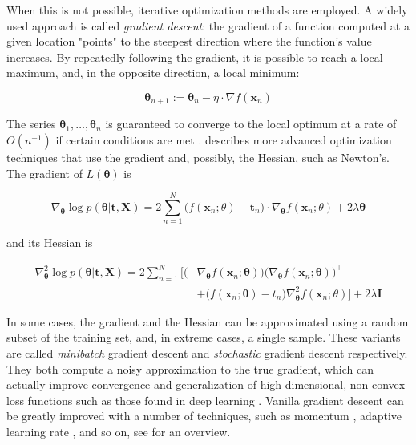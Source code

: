 \documentclass[a4paper,11pt]{kth-mag}
\begin{document}
When this is not possible, iterative optimization methods are employed. A widely used approach is called \emph{gradient descent}: the gradient of a function computed at a given location "points" to the steepest direction where the function's value increases. By repeatedly following the gradient, it is possible to reach a local maximum, and, in the opposite direction, a local minimum:

\begin{equation}
\bm\theta_{n+1}:=\bm\theta_n-\eta\cdot\nabla f(\bm x_n)
\end{equation}

The series $\bm\theta_1,\ldots,\bm\theta_n$ is guaranteed to converge to the local optimum at a rate of $O(n^{-1})$ if certain conditions are met \citep{gd_convergence}. \cite{numopt} describes more advanced optimization techniques that use the gradient and, possibly, the Hessian, such as Newton's. The gradient of $L(\bm\theta)$ is

\begin{equation}
\label{eq:least_squares_gradient}
\nabla_{\bm\theta}\log p(\bm\theta\vert\bm t,\bm X)
=2\sum_{n=1}^N \big(f(\bm x_n;\theta)-\bm t_n\big)\cdot\nabla_{\bm\theta}f(\bm x_n;\theta) + 2\lambda\bm\theta
\end{equation}

\noindent and its Hessian is

\begin{equation}
\label{eq:least_squares_hessian}
\begin{split}
\nabla^2_{\bm\theta}\log p(\bm\theta\vert\bm t,\bm X)=2\sum_{n=1}^{N}\bigg[
\big( & \nabla_{\bm\theta} f(\bm x_n;\bm\theta)\big)
\big(\nabla_{\bm\theta} f(\bm x_n;\bm\theta)\big)^\intercal
\\
& +\big(f(\bm x_n;\bm\theta)-t_n\big)\nabla^2_{\bm\theta}f(\bm x_n;\theta)\bigg]+2\lambda\bm I
\end{split}
\end{equation}

In some cases, the gradient and the Hessian can be approximated using a random subset of the training set, and, in extreme cases, a single sample. These variants are called \emph{minibatch} gradient descent and \emph{stochastic} gradient descent respectively. They both compute a noisy approximation to the true gradient, which can actually improve convergence and generalization of high-dimensional, non-convex loss functions such as those found in deep learning \citep{sgd_noise, bayesian_sgd}. Vanilla gradient descent can be greatly improved with a number of techniques, such as momentum \citep{gd_momentum}, adaptive learning rate \citep{adagrad, adadelta, adam}, and so on, see \cite{gd_overview} for an overview. 
\end{document}
